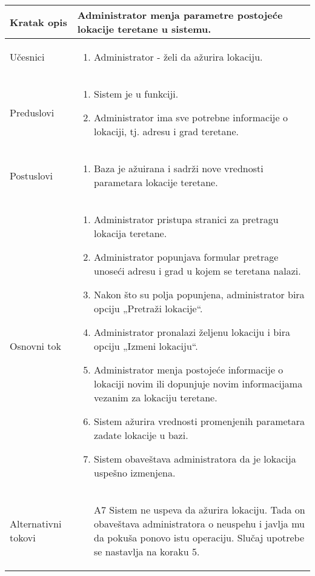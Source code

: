 \documentclass[../main.tex]{subfiles}
\begin{document}
\begin{longtable}{| p{} | p{} |} 

\hline
    Kratak opis &  Administrator menja parametre postojeće lokacije teretane u sistemu.\\ 
\hline    
    Učesnici & 
    	\begin{enumerate}
        \item Administrator - želi da ažurira lokaciju.
     \end{enumerate}\\
\hline
   Preduslovi & \begin{enumerate}
       \item Sistem je u funkciji.
       \item Administrator ima sve potrebne informacije o lokaciji, tj. adresu i grad teretane.
   \end{enumerate}\\
\hline  
    Postuslovi & \begin{enumerate}
        \item Baza je ažuirana i sadrži nove vrednosti parametara lokacije teretane.
    \end{enumerate}\\
\hline
    Osnovni tok & \begin{enumerate}
        \item Administrator pristupa stranici za pretragu lokacija teretane.
        \item Administrator popunjava formular pretrage unoseći adresu i grad u kojem se teretana nalazi.
        \item Nakon što su polja popunjena, administrator bira opciju „Pretraži lokacije“.
        \item Administrator pronalazi željenu lokaciju i bira opciju „Izmeni lokaciju“.
        \item Administrator menja postojeće informacije o lokaciji novim ili dopunjuje novim informacijama vezanim za lokaciju teretane.
        \item Sistem ažurira vrednosti promenjenih parametara zadate lokacije u bazi.
        \item Sistem obaveštava administratora da je lokacija uspešno izmenjena.
    \end{enumerate}\\
\hline
    Alternativni tokovi & \begin{itemize}
        \item[A7]  Sistem ne uspeva da ažurira lokaciju. Tada on obaveštava administratora o neuspehu i javlja mu da pokuša ponovo istu operaciju. Slučaj upotrebe se nastavlja na koraku 5.


\end{itemize}
\end{longtable}
\end{document}
